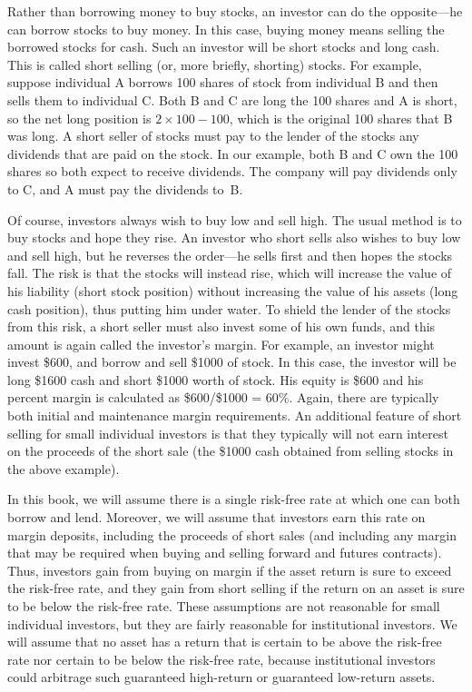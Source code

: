Rather than borrowing money to buy stocks, an investor can do the opposite---he can borrow stocks to buy money.  In this case, buying money means selling the borrowed stocks for cash.  Such an investor will be short stocks and long cash.  This is called short selling (or, more briefly, shorting) stocks.   For example, suppose individual A borrows 100 shares of stock from individual B and then sells them to individual C.  Both B and C are long the 100 shares and A is short, so the net long position is $2 \times 100 - 100$, which is the original 100 shares that B was long.  A short seller of stocks must pay to the lender of the stocks any dividends that are paid on the stock.  In our example, both B and C own the 100 shares so both expect to receive dividends.  The company will pay dividends only to C, and A must pay the dividends to~B.

Of course, investors always wish to buy low and sell high.  The usual method is to buy stocks and hope they rise.  An investor who short sells also wishes to buy low and sell high, but he reverses the order---he sells first and then hopes the stocks fall.  The risk is that the stocks will instead rise, which will increase the value of his liability (short stock position) without increasing the value of his assets (long cash position), thus putting him under water.  To shield the lender of the stocks from this risk, a short seller must also invest some of his own funds, and this amount is again called the investor's margin.  For example, an investor might invest \$600, and borrow and sell \$1000 of stock.  In this case, the investor will be long \$1600 cash and short \$1000 worth of stock.  His equity is \$600 and his percent margin is calculated as \$600/\$1000 = 60\%.  Again, there are typically both initial and maintenance margin requirements.  An additional feature of short selling for small individual investors is that they typically will not earn interest on the proceeds of the short sale (the \$1000 cash obtained from selling stocks in the above example).  

In this book, we will assume there is a single risk-free rate at which one can both borrow and lend.  Moreover, we will assume that investors earn this rate on margin deposits, including the proceeds of short sales (and including any margin that may be required when buying and selling forward and futures contracts).  Thus, investors gain from buying on margin if the asset return is sure to exceed the risk-free rate, and they gain from short selling if the return on an asset is sure to be below the risk-free rate.   These assumptions are not reasonable for small individual investors, but they are fairly reasonable for institutional investors.  We will assume that no asset has a return that is certain to be above the risk-free rate nor certain to be below the risk-free rate, because institutional investors could arbitrage  such guaranteed high-return or guaranteed low-return assets.

